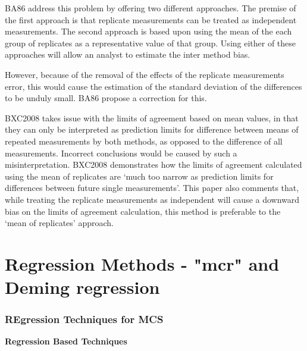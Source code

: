 \documentclass[compress]{beamer}        %
\begin{document}
\begin{frame}
\alert{BA86} address this problem by offering two different
approaches. The premise of the first approach is that replicate
measurements can be treated as independent measurements. The
second approach is based upon using the mean of the each group of
replicates as a representative value of that group. Using either
of these approaches will allow an analyst to estimate the inter
method bias.


However, because of the removal of the effects of the replicate
measurements error, this would cause the estimation of the
standard deviation of the differences to be unduly small.
\alert{BA86} propose a correction for this.
\end{frame}
\begin{frame}
\alert{BXC2008} takes issue with the limits of agreement based on
mean values, in that they can only be interpreted as prediction
limits for difference between means of repeated measurements by
both methods, as opposed to the difference of all measurements.
Incorrect conclusions would be caused by such a misinterpretation.
\alert{BXC2008} demonstrates how the limits of agreement
calculated using the mean of replicates are `much too narrow as
prediction limits for differences between future single
measurements'. This paper also comments that, while treating the
replicate measurements as independent will cause a downward bias
on the limits of agreement calculation, this method is preferable
to the `mean of replicates' approach.
\end{frame}


\section{Regression Methods - "mcr" and Deming regression}

\begin{frame}
\frametitle{REgression Techniques for MCS}
\textbf{Regression Based Techniques}
\end{frame}
\end{document}
